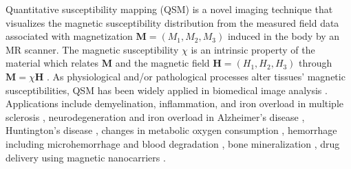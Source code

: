 \documentclass[reqno]{siamonline1116}
\numberwithin{theorem}{section}
\numberwithin{equation}{section}
\def\bH{{\mathbf H}}
\def\M{{\mathbf M}}
\begin{document}
Quantitative susceptibility mapping (QSM) \cite{L.deRochefort2010} is a novel imaging technique that visualizes the magnetic susceptibility distribution from the measured field data associated with magnetization $\M=(M_1,M_2,M_3)$ induced in the body by an MR scanner. The magnetic susceptibility $\chi$ is an intrinsic property of the material which relates $\M$ and the magnetic field $\bH=(H_1,H_2,H_3)$ through $\M=\chi\bH$ \cite{J.K.Seo2014}. As physiological and/or pathological processes alter tissues' magnetic susceptibilities, QSM has been widely applied in biomedical image analysis \cite{J.K.Seo2014}. Applications include demyelination, inflammation, and iron overload in multiple sclerosis \cite{W.Chen2014}, neurodegeneration and iron overload in Alzheimer's disease \cite{J.Acosta-Cabronero2013}, Huntington's disease \cite{J.M.G.vanBergen2016}, changes in metabolic oxygen consumption \cite{E.M.Haacke2010}, hemorrhage including microhemorrhage and blood degradation \cite{J.Klohs2011}, bone mineralization \cite{A.V.Dimov2018}, drug delivery using magnetic nanocarriers \cite{T.Liu2010}.
\end{document}
